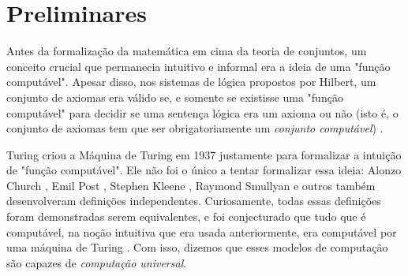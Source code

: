 \chapter{Preliminares}

Antes da formalização da matemática em cima da teoria
de conjuntos, um conceito crucial que permanecia intuitivo
e informal era a ideia de uma "função computável".
Apesar disso, nos sistemas de lógica propostos por Hilbert,
um conjunto de axiomas era válido se, e somente se existisse
uma "função computável" para decidir se uma sentença
lógica era um axioma ou não (isto é, o conjunto de axiomas
tem que ser obrigatoriamente um \textit{conjunto computável})
\cite{godelIncompletenessHilbert} \cite{churchTuring}.

Turing criou a Máquina de Turing em 1937 \cite{Turing1937}
justamente para formalizar a intuição de "função computável".
Ele não foi o único a tentar formalizar essa ideia:
Alonzo Church \cite{church1985calculi},
Emil Post \cite{Post1943},
Stephen Kleene \cite{kleeneMetamathematics},
Raymond Smullyan \cite{Smullyan1969}
e outros também desenvolveram
definições independentes.
Curiosamente, todas essas definições foram demonstradas
serem equivalentes, e foi conjecturado que tudo que é
computável, na noção intuitiva que era usada anteriormente,
era computável por uma máquina de Turing
\cite{churchTuring}. Com isso, dizemos que esses modelos
de computação são capazes de \textit{computação universal}.



